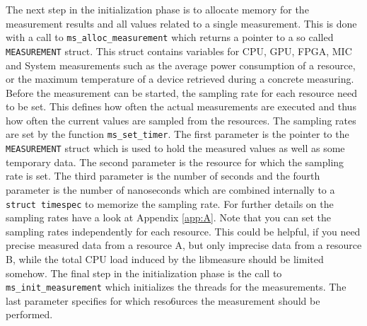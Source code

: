 The next step in the initialization phase is to allocate memory for the measurement results and all values related to a single measurement. This is done with a call to \texttt{ms\_alloc\_measurement} which returns a pointer to a so called \texttt{MEASUREMENT} struct. This struct contains variables for CPU, GPU, FPGA, MIC and System measurements such as the average power consumption of a resource, or the maximum temperature of a device retrieved during a concrete measuring.
Before the measurement can be started, the sampling rate for each resource need to be set. This defines how often the actual measurements are executed and thus how often the current values are sampled from the resources. The sampling rates are set by the function \texttt{ms\_set\_timer}. The first parameter is the pointer to the \texttt{MEASUREMENT} struct which is used to hold the measured values as well as some temporary data. The second parameter is the resource for which the sampling rate is set. The third parameter is the number of seconds and the fourth parameter is the number of nanoseconds which are combined internally to a \texttt{struct timespec} to memorize the sampling rate.  For further details on the sampling rates have a look at Appendix \ref{app:A}. Note that you can set the sampling rates independently for each resource. This could be helpful, if you need precise measured data from a resource A, but only imprecise data from a resource B, while the total CPU load induced by the libmeasure should be limited somehow. The final step in the initialization phase is the call to \texttt{ms\_init\_measurement} which initializes the threads for the measurements. The last parameter specifies for which reso6urces the measurement should be performed.\\

